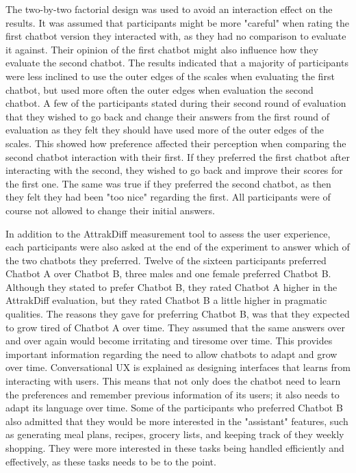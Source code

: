 The two-by-two factorial design was used to avoid an interaction effect on the results. It was assumed that participants might be more "careful" when rating the first chatbot version they interacted with, as they had no comparison to evaluate it against. Their opinion of the first chatbot might also influence how they evaluate the second chatbot. The results indicated that a majority of participants were less inclined to use the outer edges of the scales when evaluating the first chatbot, but used more often the outer edges when evaluation the second chatbot. A few of the participants stated during their second round of evaluation that they wished to go back and change their answers from the first round of evaluation as they felt they should have used more of the outer edges of the scales. This showed how preference affected their perception when comparing the second chatbot interaction with their first. If they preferred the first chatbot after interacting with the second, they wished to go back and improve their scores for the first one. The same was true if they preferred the second chatbot, as then they felt they had been "too nice" regarding the first. All participants were of course not allowed to change their initial answers.

In addition to the AttrakDiff measurement tool to assess the user experience, each participants were also asked at the end of the experiment to answer which of the two chatbots they preferred. Twelve of the sixteen participants preferred Chatbot A over Chatbot B, three males and one female preferred Chatbot B. Although they stated to prefer Chatbot B, they rated Chatbot A higher in the AttrakDiff evaluation, but they rated Chatbot B a little higher in pragmatic qualities. The reasons they gave for preferring Chatbot B, was that they expected to grow tired of Chatbot A over time. They assumed that the same answers over and over again would become irritating and tiresome over time. This provides important information regarding the need to allow chatbots to adapt and grow over time. Conversational UX is explained as designing interfaces that learns from interacting with users. This means that not only does the chatbot need to learn the preferences and remember previous information of its users; it also needs to adapt its language over time. Some of the participants who preferred Chatbot B also admitted that they would be more interested in the "assistant" features, such as generating meal plans, recipes, grocery lists, and keeping track of they weekly shopping. They were more interested in these tasks being handled efficiently and effectively, as these tasks needs to be to the point. 

